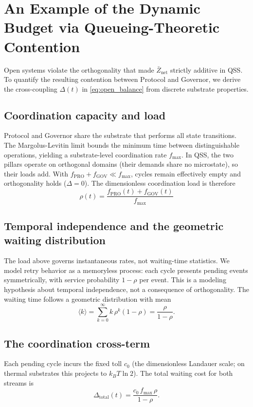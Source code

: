 \section{An Example of the Dynamic Budget via Queueing-Theoretic Contention}
\label{app:dynamic_budget}

Open systems violate the orthogonality that made $\bar{Z}_{\mathrm{net}}$ strictly additive in QSS. To quantify the resulting contention between Protocol and Governor, we derive the cross-coupling $\Delta(t)$ in \cref{eq:open_balance} from discrete substrate properties.

\subsection{Coordination capacity and load}
Protocol and Governor share the substrate that performs all state transitions. The Margolus-Levitin limit bounds the minimum time between distinguishable operations, yielding a substrate-level coordination rate $f_{\max}$. In QSS, the two pillars operate on orthogonal domains (their demands share no microstate), so their loads add. With $f_{\mathrm{PRO}} + f_{\mathrm{GOV}} \ll f_{\max}$, cycles remain effectively empty and orthogonality holds ($\Delta = 0$). The dimensionless coordination load is therefore
\begin{equation}
    \rho(t) = \frac{f_{\text{PRO}}(t) + f_{\text{GOV}}(t)}{f_{\text{max}}}
\end{equation}

\subsection{Temporal independence and the geometric waiting distribution}
The load above governs instantaneous rates, not waiting-time statistics. We model retry behavior as a memoryless process: each cycle presents pending events symmetrically, with service probability $1-\rho$ per event. This is a modeling hypothesis about temporal independence, not a consequence of orthogonality. The waiting time follows a geometric distribution with mean
\begin{equation}
    \langle k \rangle = \sum_{k=0}^{\infty} k \, \rho^k(1-\rho) = \frac{\rho}{1-\rho}.
\end{equation}

\subsection{The coordination cross-term}
Each pending cycle incurs the fixed toll $c_0$ (the dimensionless Landauer scale; on thermal substrates this projects to $k_B T \ln 2$). The total waiting cost for both streams is
\begin{equation}
    \Delta_{\text{total}}(t) = \frac{c_0 \, f_{\max} \, \rho}{1-\rho}.
\end{equation}

